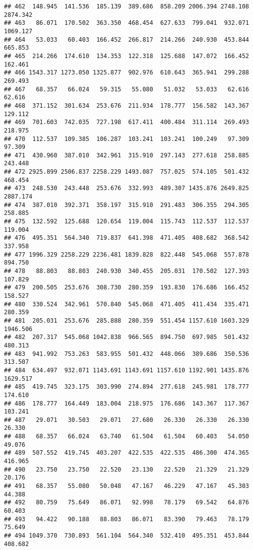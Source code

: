 \documentclass[
]{article}
\begin{document}
\begin{verbatim}
## 462  148.945  141.536  185.139  389.686  858.209 2006.394 2748.108 2874.342
## 463   86.071  170.502  363.350  468.454  627.633  799.041  932.071 1069.127
## 464   53.033   60.403  166.452  266.817  214.266  240.930  453.844  665.853
## 465  214.266  174.610  134.353  122.318  125.688  147.072  166.452  162.461
## 466 1543.317 1273.050 1325.877  902.976  610.643  365.941  299.288  269.493
## 467   68.357   66.024   59.315   55.080   51.032   53.033   62.616   62.616
## 468  371.152  301.634  253.676  211.934  178.777  156.582  143.367  129.112
## 469  701.603  742.035  727.198  617.411  400.484  311.114  269.493  218.975
## 470  112.537  109.385  106.287  103.241  103.241  100.249   97.309   97.309
## 471  430.960  387.010  342.961  315.910  297.143  277.618  258.885  243.448
## 472 2925.899 2506.837 2258.229 1493.087  757.025  574.105  501.432  468.454
## 473  248.530  243.448  253.676  332.993  489.307 1435.876 2649.825 2887.174
## 474  387.010  392.371  358.197  315.910  291.483  306.355  294.305  258.885
## 475  132.592  125.688  120.654  119.004  115.743  112.537  112.537  119.004
## 476  495.351  564.340  719.837  641.398  471.405  408.682  368.542  337.958
## 477 1996.329 2258.229 2236.481 1839.828  822.448  545.068  557.878  894.750
## 478   88.803   88.803  240.930  340.455  205.031  170.502  127.393  107.829
## 479  200.505  253.676  308.730  280.359  193.830  176.686  166.452  158.527
## 480  330.524  342.961  570.840  545.068  471.405  411.434  335.471  280.359
## 481  205.031  253.676  285.888  280.359  551.454 1157.610 1603.329 1946.506
## 482  207.317  545.068 1042.838  966.565  894.750  697.985  501.432  480.313
## 483  941.992  753.263  583.955  501.432  448.066  389.686  350.536  313.507
## 484  634.497  932.071 1143.691 1143.691 1157.610 1192.901 1435.876 1629.517
## 485  419.745  323.175  303.990  274.894  277.618  245.981  178.777  174.610
## 486  178.777  164.449  183.004  218.975  176.686  143.367  117.367  103.241
## 487   29.071   30.503   29.071   27.680   26.330   26.330   26.330   26.330
## 488   68.357   66.024   63.740   61.504   61.504   60.403   54.050   49.076
## 489  507.552  419.745  403.207  422.535  422.535  486.300  474.365  416.965
## 490   23.750   23.750   22.520   23.130   22.520   21.329   21.329   20.176
## 491   68.357   55.080   50.048   47.167   46.229   47.167   45.303   44.388
## 492   80.759   75.649   86.071   92.998   78.179   69.542   64.876   60.403
## 493   94.422   90.188   88.803   86.071   83.390   79.463   78.179   75.649
## 494 1049.370  730.893  561.104  564.340  532.410  495.351  453.844  408.682

\end{verbatim}
\end{document}
